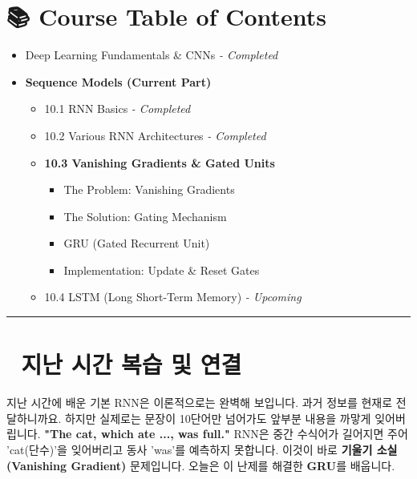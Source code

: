 \documentclass[11pt,a4paper]{book}
\theoremstyle{definition}
\begin{document}
\section*{📚 Course Table of Contents}
\begin{itemize}
    \item[Chapter 1-9.] Deep Learning Fundamentals \& CNNs \textit{- Completed}
    \item[\textbf{Chapter 10.}] \textbf{Sequence Models (Current Part)}
    \begin{itemize}
        \item 10.1 RNN Basics \textit{- Completed}
        \item 10.2 Various RNN Architectures \textit{- Completed}
        \item \textbf{10.3 Vanishing Gradients \& Gated Units}
        \begin{itemize}
            \item The Problem: Vanishing Gradients
            \item The Solution: Gating Mechanism
            \item GRU (Gated Recurrent Unit)
            \item Implementation: Update \& Reset Gates
        \end{itemize}
        \item 10.4 LSTM (Long Short-Term Memory) \textit{- Upcoming}
    \end{itemize}
\end{itemize}

\vspace{0.5cm}
\hrule
\vspace{0.5cm}

\section*{🔗 지난 시간 복습 및 연결}
지난 시간에 배운 기본 RNN은 이론적으로는 완벽해 보입니다. 과거 정보를 현재로 전달하니까요.
하지만 실제로는 문장이 10단어만 넘어가도 앞부분 내용을 까맣게 잊어버립니다.
\textbf{"The cat, which ate ..., was full."}
RNN은 중간 수식어가 길어지면 주어 'cat(단수)'을 잊어버리고 동사 'was'를 예측하지 못합니다.
이것이 바로 \textbf{기울기 소실(Vanishing Gradient)} 문제입니다. 오늘은 이 난제를 해결한 \textbf{GRU}를 배웁니다.

\end{document}
